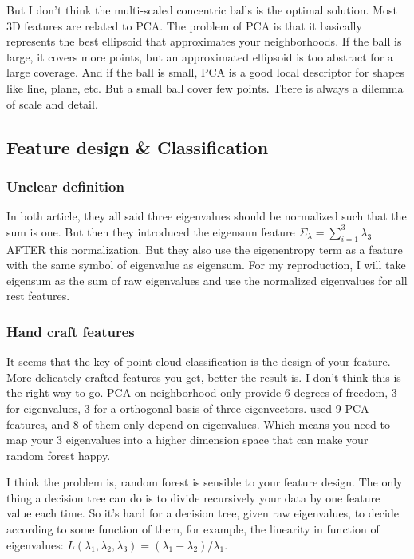 \documentclass{article}
\begin{document}
But I don't think the multi-scaled concentric balls is the optimal solution. Most 3D features are related to PCA. The problem of PCA is that it basically represents the best ellipsoid that approximates your neighborhoods. If the ball is large, it covers more points, but an approximated ellipsoid is too abstract for a large coverage. And if the ball is small, PCA is a good local descriptor for shapes like line, plane, etc. But a small ball cover few points. There is always a dilemma of scale and detail.

\subsection{Feature design \& Classification}
\subsubsection{Unclear definition}
In both article, they all said three eigenvalues should be normalized such that the sum is one. But then they introduced the eigensum feature $\Sigma_\lambda = \sum_{i=1}^{3} \lambda_3$ AFTER this normalization. But they also use the eigenentropy term as a feature with the same symbol of eigenvalue as eigensum. For my reproduction, I will take eigensum as the sum of raw eigenvalues and use the normalized eigenvalues for all rest features.

\subsubsection{Hand craft features}
It seems that the key of point cloud classification is the design of your feature. More delicately crafted features you get, better the result is. I don't think this is the right way to go. PCA on neighborhood only provide 6 degrees of freedom, 3 for eigenvalues, 3 for a orthogonal basis of three eigenvectors. \cite{hackel2016fast} used 9 PCA features, and 8 of them only depend on eigenvalues. Which means you need to map your 3 eigenvalues into a higher dimension space that can make your random forest happy. 

I think the problem is, random forest is sensible to your feature design. The only thing a decision tree can do is to divide recursively your data by one feature value each time. So it's hard for a decision tree, given raw eigenvalues, to decide according to some function of them, for example, the linearity in function of eigenvalues: $L(\lambda_1,\lambda_2,\lambda_3) = (\lambda_1-\lambda_2)/\lambda_1$.
\end{document}
